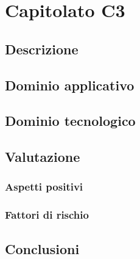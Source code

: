 \documentclass[../StudioDiFattibilita.tex]{subfiles}
\begin{document}
	\section{Capitolato C3}
		\subsection{Descrizione}
		\subsection{Dominio applicativo}
		\subsection{Dominio tecnologico}
		\subsection{Valutazione}
			\subsubsection{Aspetti positivi}
			\subsubsection{Fattori di rischio}
			\subsection{Conclusioni}
\end{document}

